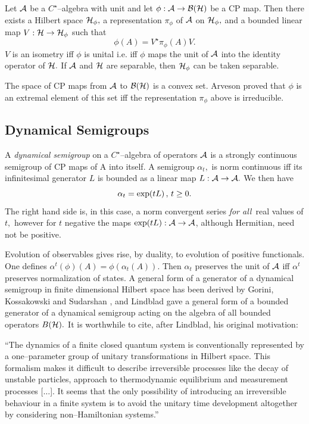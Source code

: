 \documentclass[12pt]{article}
\def\be{\begin{equation}} \def\ee{\end{equation}}
\begin{document}
\begin{theorem}
Let ${\cal A}$ be a
$C^{\star}$--algebra with unit and let $\phi : {\cal A}\rightarrow
{\cal B} ({\cal H})$ be a CP map.  Then there exists a
Hilbert space ${\cal H}_\phi , $ a representation $\pi_\phi$ of ${\cal A}$
on ${\cal H}_\phi ,  $ and a bounded linear map $V :  {\cal
H}\rightarrow {\cal H}_\phi $ such that  
\be \phi  (A) = V^{\star}\pi_\phi
 (A) V .  
\ee $V$ is an isometry iff $\phi$ is unital i.e.  iff $\phi$
maps the unit of ${\cal A}$ into the identity operator of ${\cal H}. $
If ${\cal A}$ and ${\cal H}$ are separable,  then ${\cal H}_\phi $ can
be taken separable. 
\end{theorem}
\vspace{1cm}
The space of CP maps from ${\cal A}$ to ${\cal B} ({\cal H})$
is a convex set.  Arveson \cite{arv} proved that $\phi $ is an extremal
element of this set iff the representation $\pi_\phi$ above is irreducible. 

\subsection{Dynamical Semigroups}

A {\sl dynamical semigroup} on a $C^{\star }$--algebra of operators ${\cal A}$ 
is
a strongly continuous semigroup of CP maps of {\cal A} into
itself.  A semigroup $\alpha _t , $ is norm continuous 
iff its infinitesimal
generator $L$ is bounded as a linear map $L: {\cal A}\rightarrow {\cal A} . $
We then have \be
\alpha _t=\exp (t L) \thinspace , \thinspace t\geq 0 .  \ee
The right hand side is,  in this case,   a norm convergent series {\sl for all}\
real values of $t, $ however for $t$ negative the maps $\exp (tL): {\cal A}
\rightarrow {\cal A}$, although Hermitian, need not be positive.

Evolution of observables
gives rise,  by duality,  to evolution of positive functionals.  One defines $
\alpha ^t (\phi ) (A)=\phi  (\alpha _t (A)). $ Then $\alpha _t$ preserves the
unit of ${\cal A}$ iff $\alpha ^t$ preserves normalization of states.  A
general form of a generator of a dynamical semigroup in finite dimensional
Hilbert space has been derived by Gorini,  Kossakowski and Sudarshan \cite
{koss},  and Lindblad \cite{lin} gave a general form of a bounded generator of
a dynamical semigroup acting on the algebra of all bounded operators ${\sl B}
 ({\cal H}). $ It is worthwhile to cite, after Lindblad, his
 original motivation:

``The dynamics of a finite closed quantum system is conventionally
represented by a one--parameter group of unitary transformations in Hilbert
space.  This formalism makes it difficult to describe irreversible processes
like the decay of unstable particles,  approach to thermodynamic equilibrium
and measurement processes [$\ldots $].  It seems that the only possibility of
introducing an irreversible behaviour in a finite system is to avoid the
unitary time development altogether by considering non--Hamiltonian systems.''
\end{document}
